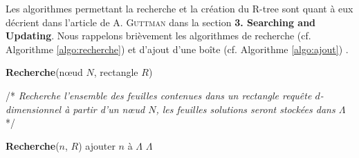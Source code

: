 Les algorithmes permettant la recherche et la création du R-tree sont quant à eux décrient dans l'article de \textsc{A. Guttman} dans la section \textbf{3. Searching and Updating}\cite{Guttman}. Nous rappelons brièvement les algorithmes de recherche (cf. Algorithme \ref{algo:recherche}) et d'ajout d'une boîte (cf. Algorithme \ref{algo:ajout}) \cite{poulos}.

\begin{algorithm}
\caption{\textbf{Recherche}(nœud $N$, rectangle $R$)}
/* \textit{Recherche l'ensemble des feuilles contenues dans un rectangle requête $d$-dimensionnel à partir d'un nœud $N$, les feuilles solutions seront stockées dans $\Lambda$} */
\label{algo:recherche}
\begin{algorithmic}[1]
    \STATE \textbf{Recherche}($n$, $R$)
  \ENDFOR
{}%
    \STATE ajouter $n$ à $\Lambda$
  \ENDFOR
\ENDIF
\RETURN $\Lambda$
\end{algorithmic}
\end{algorithm}

